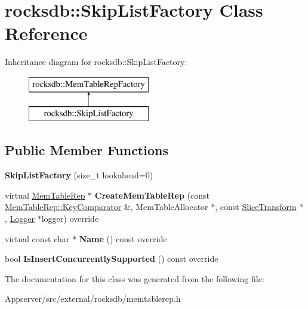 \hypertarget{classrocksdb_1_1SkipListFactory}{}\section{rocksdb\+:\+:Skip\+List\+Factory Class Reference}
\label{classrocksdb_1_1SkipListFactory}
Inheritance diagram for rocksdb\+:\+:Skip\+List\+Factory\+:\begin{figure}[H]
\begin{center}
\leavevmode
\includegraphics[height=2.000000cm]{classrocksdb_1_1SkipListFactory}
\end{center}
\end{figure}
\subsection*{Public Member Functions}
\begin{DoxyCompactItemize}
\item 
{\bfseries Skip\+List\+Factory} (size\+\_\+t lookahead=0)\hypertarget{classrocksdb_1_1SkipListFactory_accfa061fb6835e8abb4d2e608665d90f}{}\label{classrocksdb_1_1SkipListFactory_accfa061fb6835e8abb4d2e608665d90f}

\item 
virtual \hyperlink{classrocksdb_1_1MemTableRep}{Mem\+Table\+Rep} $\ast$ {\bfseries Create\+Mem\+Table\+Rep} (const \hyperlink{classrocksdb_1_1MemTableRep_1_1KeyComparator}{Mem\+Table\+Rep\+::\+Key\+Comparator} \&, Mem\+Table\+Allocator $\ast$, const \hyperlink{classrocksdb_1_1SliceTransform}{Slice\+Transform} $\ast$, \hyperlink{classrocksdb_1_1Logger}{Logger} $\ast$logger) override\hypertarget{classrocksdb_1_1SkipListFactory_a28842962855f92252702662cf2aff7c6}{}\label{classrocksdb_1_1SkipListFactory_a28842962855f92252702662cf2aff7c6}

\item 
virtual const char $\ast$ {\bfseries Name} () const override\hypertarget{classrocksdb_1_1SkipListFactory_abbac2106e3be29318a6b8500df116596}{}\label{classrocksdb_1_1SkipListFactory_abbac2106e3be29318a6b8500df116596}

\item 
bool {\bfseries Is\+Insert\+Concurrently\+Supported} () const override\hypertarget{classrocksdb_1_1SkipListFactory_a8fddb4482fda6f94467d44a15b36e878}{}\label{classrocksdb_1_1SkipListFactory_a8fddb4482fda6f94467d44a15b36e878}

\end{DoxyCompactItemize}


The documentation for this class was generated from the following file\+:\begin{DoxyCompactItemize}
\item 
Appserver/src/external/rocksdb/memtablerep.\+h\end{DoxyCompactItemize}
